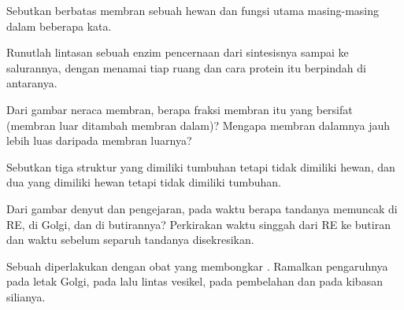 \begin{exercise}[$\star$]\label{exo:b1:eukaryotic-cell:1}
Sebutkan  berbatas membran sebuah  hewan dan fungsi utama
masing-masing dalam beberapa kata.
\end{exercise}

\begin{exercise}[$\star$]\label{exo:b1:eukaryotic-cell:2}
Runutlah lintasan sebuah enzim pencernaan dari sintesisnya sampai ke
salurannya, dengan menamai tiap ruang dan cara protein itu berpindah di
antaranya.
\end{exercise}

\begin{exercise}[$\star$]\label{exo:b1:eukaryotic-cell:3}
Dari gambar neraca membran, berapa fraksi membran  itu yang bersifat
 (membran luar ditambah membran dalam)? Mengapa membran
dalamnya jauh lebih luas daripada membran luarnya?
\end{exercise}

\begin{exercise}[$\star$]\label{exo:b1:eukaryotic-cell:4}
Sebutkan tiga struktur yang dimiliki  tumbuhan tetapi tidak dimiliki
 hewan, dan dua yang dimiliki  hewan tetapi tidak dimiliki 
tumbuhan.
\end{exercise}

\begin{exercise}[$\star\star$]\label{exo:b1:eukaryotic-cell:5}
Dari gambar denyut dan pengejaran, pada waktu berapa tandanya memuncak
di RE, di Golgi, dan di butirannya? Perkirakan waktu singgah dari RE ke
butiran dan waktu sebelum separuh tandanya disekresikan.
\end{exercise}

\begin{exercise}[$\star\star$]\label{exo:b1:eukaryotic-cell:6}
Sebuah  diperlakukan dengan obat yang membongkar .
Ramalkan pengaruhnya pada letak Golgi, pada lalu lintas vesikel, pada
pembelahan  dan pada kibasan silianya.
\end{exercise}

